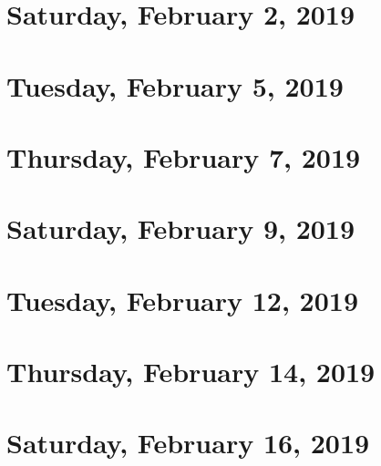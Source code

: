 \documentclass[reqno]{amsart}
\begin{document}
\section{Saturday, February 2, 2019}
    
    
\section{Tuesday, February 5, 2019}
    

\section{Thursday, February 7, 2019}
    

\section{Saturday, February 9, 2019}
    
    
\section{Tuesday, February 12, 2019}
    

\section{Thursday, February 14, 2019}
    

\section{Saturday, February 16, 2019}
    
\end{document}
